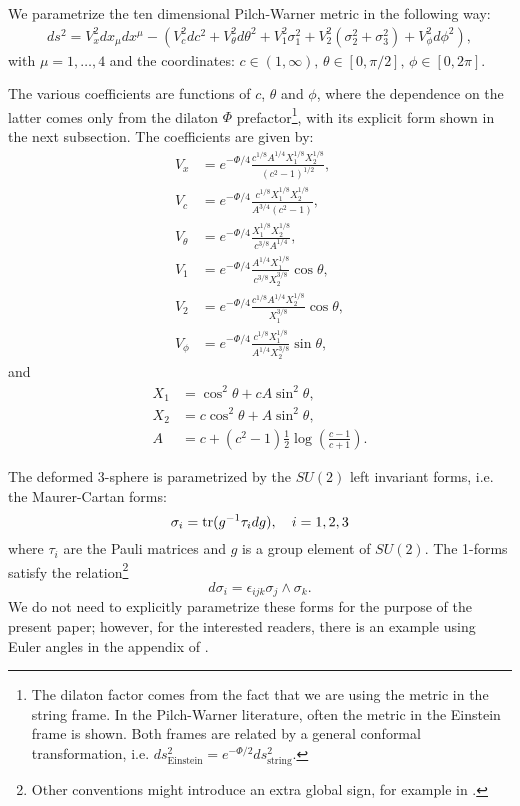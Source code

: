We parametrize the ten dimensional Pilch-Warner metric in the following way:
\begin{align}\label{eq:PWmetric}
ds^2 =
V_x^2 dx_\mu dx^\mu -\left(
V_c^2 dc^2 + V_\theta^2 d\theta^2 + V_1^2 \sigma_1^2 + V_2^2 (\sigma_2^2 + \sigma_3^2) + V_\phi^2 d\phi^2\right),
\end{align}
with $\mu=1,\ldots,4$ and the coordinates: $c\in(1, \infty), \, \theta \in [0, \pi/2], \, \phi \in [0, 2\pi]$. 

The various coefficients are functions of $c$, $\theta$ and $\phi$, where the dependence on the latter comes only from the dilaton $\Phi$ prefactor\footnote{The dilaton factor comes from the fact that we are using the metric in the string frame. In the Pilch-Warner literature, often the metric in the Einstein frame is shown. Both frames are related by a general conformal transformation, i.e. $ds^2_\text{Einstein} = e^{-\Phi / 2} ds^2_\text{string}$.}, with its explicit form shown in the next subsection. 
The coefficients are given by:
\begin{align}\label{eq:PWvielbeins}
V_x &=e^{-\Phi/4} \frac{c^{1/8} A^{1/4} X_1^{1/8} X_2^{1/8}}{(c^2 - 1)^{1/2}},\nonumber\\
V_c &= e^{-\Phi/4}\frac{c^{1/8}X_1^{1/8} X_2^{1/8}}{A^{3/4} (c^2-1)},\nonumber\\
V_\theta &= e^{-\Phi/4}\frac{X_1^{1/8} X_2^{1/8}}{c^{3/8}A^{1/4}},\nonumber\\
V_1 &= e^{-\Phi/4}\frac{A^{1/4}X_1^{1/8} }{c^{3/8}X_2^{3/8}} \cos\theta,\nonumber\\
V_2 &= e^{-\Phi/4}\frac{c^{1/8}A^{1/4}X_2^{1/8} }{X_1^{3/8}} \cos\theta, \nonumber\\
V_\phi &= e^{-\Phi/4}\frac{c^{1/8}X_1^{1/8} }{A^{1/4}X_2^{3/8}} \sin\theta,
\end{align}
and
\begin{align}
X_1 &=  \cos^2\theta + cA  \sin^2\theta,\nonumber\\
X_2 &= c \cos^2\theta + A  \sin^2\theta, \nonumber\\
A &= c+(c^2 -1)\frac{1}{2}\log\left(\frac{c-1}{c+1}\right).
\end{align}

The deformed 3-sphere is parametrized by the $SU(2)$ left invariant forms, i.e. the Maurer-Cartan forms:
\begin{equation}
\sigma_i = \mathop{\mathrm{tr}}(g^{-1}\tau_i d g), \quad i = 1,2,3
\end{equation}
where $\tau_i$ are the Pauli matrices and $g$ is a group element of $SU(2)$. The 1-forms satisfy the relation\footnote{Other conventions might introduce an extra global sign, for example in \cite{Buchel:2000cn}.}
\begin{equation}
 d\sigma_i  = \epsilon_{i j k} \sigma_j \wedge \sigma_k.
\end{equation}
We do not need to explicitly parametrize these forms for the purpose of the present paper; however, for the interested readers, there is an example using Euler angles in the appendix of \cite{Chen-Lin:2015xlh}. 


